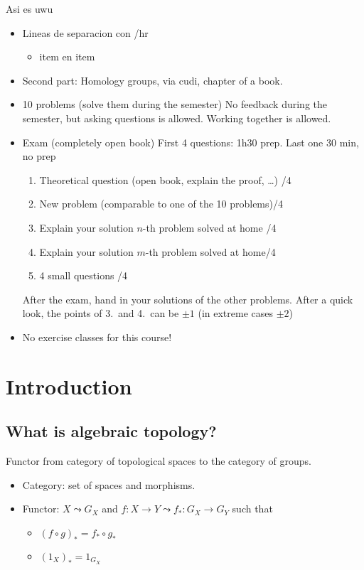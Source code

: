 
 {Asi es uwu}

\begin{itemize}
    \item Lineas de separacion con /hr
        \begin{itemize}
            \item item en item
        \end{itemize}
    \hr
    
    \item Second part: Homology groups, via cudi, chapter of a book.
    \item 10 problems (solve them during the semester) No feedback during the semester, but asking questions is allowed. Working together is allowed.
    \item Exam (completely open book) First 4 questions: 1h30 prep. Last one 30 min, no prep
        \begin{enumerate}
            \item Theoretical question (open book, explain the proof, \ldots) \hfill /4
            \item New problem (comparable to one of the 10 problems)\hfill /4
            \item Explain your solution $n$-th problem solved at home \hfill /4
            \item Explain your solution $m$-th problem solved at home\hfill /4
            \item 4 small questions \hfill /4
        \end{enumerate}
        After the exam, hand in your solutions of the other problems. After a quick look, the points of 3.\ and 4.\ can be $\pm 1$ (in extreme cases $\pm 2$)
    \item No exercise classes for this course!
\end{itemize}

\setcounter{chapter}{-1}
\chapter{Introduction}

\section{What is algebraic topology?}
Functor from category of topological spaces to the category of groups.
\begin{itemize}
    \item Category: set of spaces and morphisms.
    \item Functor: $X \leadsto G_X$ and  $f:X\to Y \leadsto f_*: G_X \to  G_Y$ such that
        \begin{itemize}
            \item $(f \circ g)_* = f_* \circ g_* $
            \item $(1_X)_* = 1_{G_X}$
        \end{itemize}
\end{itemize}


